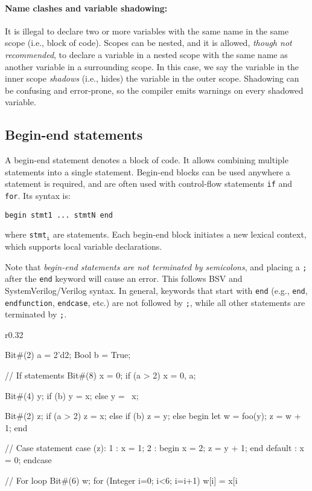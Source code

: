 \paragraph{Name clashes and variable shadowing:}
It is illegal to declare two or more variables with the same name in the same scope (i.e., block of code).
Scopes can be nested, and it is allowed, \emph{though not recommended},
to declare a variable in a nested scope with the same name as another variable in a surrounding scope.
In this case, we say the variable in the inner scope \emph{shadows} (i.e., hides) the variable in the outer scope.
Shadowing can be confusing and error-prone, so the compiler emits warnings on every shadowed variable.

\subsection{Begin-end statements}

A begin-end statement denotes a block of code. It allows combining multiple statements into a single statement.
Begin-end blocks can be used anywhere a statement is required, and are often used with control-flow
statements \verb|if| and \verb|for|. Its syntax is:
\begin{center}
\verb|begin stmt1 ... stmtN end|
\end{center}
where \verb|stmt|$_{\texttt{i}}$ are statements. Each begin-end block initiates a new lexical context,
which supports local variable declarations.

Note that \emph{begin-end statements are not terminated by semicolons},
and placing a \verb|;| after the \verb|end| keyword will cause an error.
This follows BSV and SystemVerilog/Verilog syntax.
In general, keywords that start with \verb|end| (e.g., \verb|end|, \verb|endfunction|, \verb|endcase|, etc.)
are not followed by \verb|;|, while all other statements are terminated by \verb|;|.

\begin{wrapfigure}{r}{0.32\columnwidth}
\vspace{-4.5em}
\begin{mscode}
Bit#(2) a = 2'd2;
Bool b = True;

// If statements
Bit#(8) x = 0;
if (a > 2) x = {0, a};

Bit#(4) y;
if (b) y = x;
else y = ~x;

Bit#(2) z;
if (a > 2) z = x;
else if (b) z = y;
else begin
  let w = foo(y);
  z = w + 1;
end

// Case statement
case (z):
  1 : x = 1;
  2 : begin
        x = 2;
        z = y + 1;
      end
  default : x = 0;
endcase

// For loop
Bit#(6) w;
for (Integer i=0; i<6; i=i+1)
  w[i] = x[i %
\end{mscode}
\vspace{-7.5em}
\end{wrapfigure}

